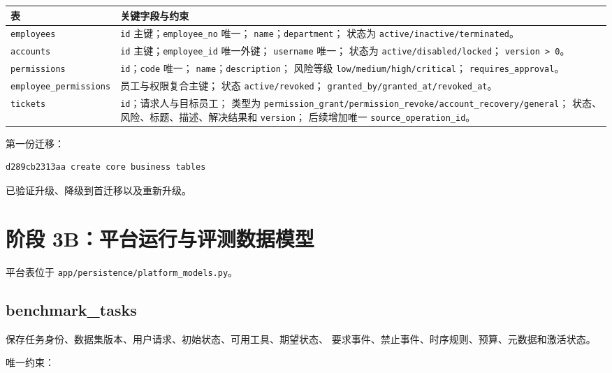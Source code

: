 \documentclass[11pt,a4paper]{ctexart}
\begin{document}
\begin{longtable}{p{3.3cm}p{10cm}}
\toprule
表 & 关键字段与约束 \\
\midrule
\texttt{employees} &
\texttt{id} 主键；\texttt{employee\_no} 唯一；
\texttt{name}；\texttt{department}；
状态为 \texttt{active/inactive/terminated}。 \\

\texttt{accounts} &
\texttt{id} 主键；\texttt{employee\_id} 唯一外键；
\texttt{username} 唯一；
状态为 \texttt{active/disabled/locked}；
\texttt{version > 0}。 \\

\texttt{permissions} &
\texttt{id}；\texttt{code} 唯一；
\texttt{name}；\texttt{description}；
风险等级 \texttt{low/medium/high/critical}；
\texttt{requires\_approval}。 \\

\texttt{employee\_permissions} &
员工与权限复合主键；
状态 \texttt{active/revoked}；
\texttt{granted\_by/granted\_at/revoked\_at}。 \\

\texttt{tickets} &
\texttt{id}；请求人与目标员工；
类型为 \texttt{permission\_grant/permission\_revoke/account\_recovery/general}；
状态、风险、标题、描述、解决结果和 \texttt{version}；
后续增加唯一 \texttt{source\_operation\_id}。 \\
\bottomrule
\end{longtable}

第一份迁移：

\begin{lstlisting}
d289cb2313aa create core business tables
\end{lstlisting}

已验证升级、降级到首迁移以及重新升级。

\section{阶段 3B：平台运行与评测数据模型}

平台表位于 \texttt{app/persistence/platform\_models.py}。

\subsection{benchmark\_tasks}

保存任务身份、数据集版本、用户请求、初始状态、可用工具、期望状态、
要求事件、禁止事件、时序规则、预算、元数据和激活状态。

唯一约束：
\end{document}
